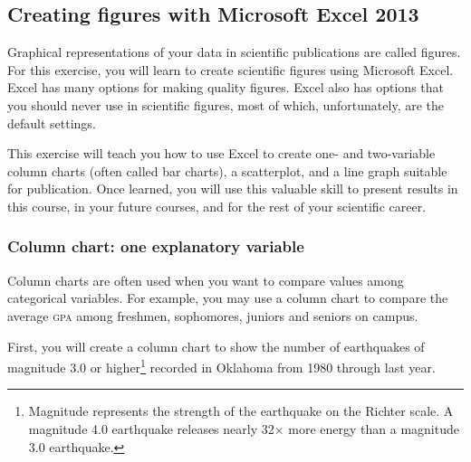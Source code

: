 \documentclass[12pt, hidelinks]{exam}
\begin{document}
\subsection*{Creating figures with Microsoft Excel 2013\texttrademark}

Graphical representations of your data in scientific publications are called figures. For this exercise, you will learn to create scientific figures using Microsoft Excel. Excel has many options for making quality figures. Excel also has options that you should never use in scientific figures, most of which, unfortunately, are the default settings.  

This exercise will teach you how to use Excel to create one- and two-variable column charts (often called bar charts), a scatterplot, and a line graph suitable for publication. Once learned, you will use this valuable skill to present results in this course, in your future courses, and for the rest of your scientific career. 

\subsubsection*{Column chart: one explanatory variable}

Column charts are often used when you want to compare values among categorical variables. For example, you may use a column chart to compare the average \textsc{gpa} among freshmen, sophomores, juniors and seniors on campus. 

First, you will create a column chart to show the number of earthquakes of magnitude 3.0 or higher\footnote{Magnitude represents the strength of the earthquake on the Richter scale. A magnitude 4.0 earthquake releases nearly 32$\times$ more energy than a magnitude 3.0 earthquake.} recorded in Oklahoma from 1980 through last year. \bigskip
\end{document}
